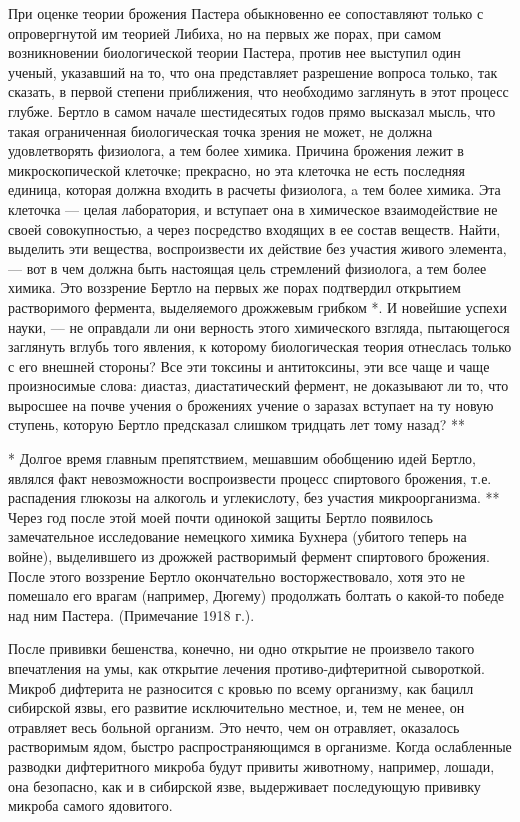 При оценке теории брожения Пастера обыкновенно ее сопоставляют только  с
опровергнутой им  теорией  Либиха, но  на  первых же  порах,  при  самом
возникновении биологической  теории Пастера,  против нее  выступил  один
ученый, указавший на то, что она представляет разрешение вопроса только,
так сказать, в  первой степени приближения,  что необходимо заглянуть  в
этот процесс  глубже. Бертло  в самом  начале шестидесятых  годов  прямо
высказал мысль,  что такая  ограниченная биологическая  точка зрения  не
может, не должна  удовлетворять физиолога, а  тем более химика.  Причина
брожения лежит в микроскопической  клеточке; прекрасно, но эта  клеточка
не есть последняя единица, которая должна входить в расчеты физиолога, a
тем более химика.  Эта клеточка ---  целая лаборатория, и  вступает она  в
химическое взаимодействие  не своей  совокупностью, а  через  посредство
входящих  в   ее  состав   веществ.   Найти,  выделить   эти   вещества,
воспроизвести их  действие без  участия  живого элемента,  --- вот  в  чем
должна быть настоящая цель стремлений физиолога, а тем более химика. Это
воззрение Бертло на  первых же порах  подтвердил открытием  растворимого
фермента, выделяемого дрожжевым грибком *. И новейшие успехи науки, --- не
оправдали  ли  они  верность  этого  химического  взгляда,   пытающегося
заглянуть вглубь того явления, к которому биологическая теория отнеслась
только с его  внешней стороны? Все  эти токсины и  антитоксины, эти  все
чаще и  чаще произносимые  слова:  диастаз, диастатический  фермент,  не
доказывают ли то,  что выросшее  на почве  учения о  брожениях учение  о
заразах вступает на ту новую ступень, которую Бертло предсказал  слишком
тридцать лет тому назад? **

* Долгое время главным препятствием, мешавшим обобщению идей Бертло,
являлся факт невозможности воспроизвести процесс спиртового брожения,
т.е. распадения глюкозы на алкоголь и углекислоту, без участия
микроорганизма.
** Через год после этой моей почти одинокой защиты Бертло появилось
замечательное исследование немецкого химика Бухнера (убитого теперь на
войне), выделившего из дрожжей растворимый фермент спиртового
брожения. После этого воззрение Бертло окончательно восторжествовало,
хотя это не помешало его врагам (например, Дюгему) продолжать болтать
о какой-то победе над ним Пастера. (Примечание 1918 г.).

После прививки бешенства, конечно, ни одно открытие не произвело  такого
впечатления на умы, как открытие лечения противо-дифтеритной сывороткой.
Микроб дифтерита не разносится с  кровью по всему организму, как  бацилл
сибирской язвы, его развитие исключительно местное, и, тем не менее,  он
отравляет весь больной организм. Это нечто, чем он отравляет,  оказалось
растворимым  ядом,   быстро   распространяющимся  в   организме.   Когда
ослабленные  разводки  дифтеритного  микроба  будут  привиты  животному,
например, лошади, она  безопасно, как  и в  сибирской язве,  выдерживает
последующую прививку микроба самого ядовитого.

